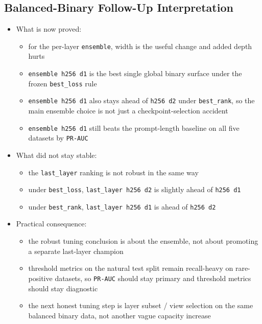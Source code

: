\documentclass[11pt]{article}
\begin{document}
\subsection*{Balanced-Binary Follow-Up Interpretation}
\begin{itemize}[leftmargin=1.5em]
\item What is now proved:
  \begin{itemize}[leftmargin=1.5em]
  \item for the per-layer \texttt{ensemble}, width is the useful change and added depth hurts
  \item \texttt{ensemble h256 d1} is the best single global binary surface under the frozen \texttt{best\_loss} rule
  \item \texttt{ensemble h256 d1} also stays ahead of \texttt{h256 d2} under \texttt{best\_rank}, so the main ensemble choice is not just a checkpoint-selection accident
  \item \texttt{ensemble h256 d1} still beats the prompt-length baseline on all five datasets by \texttt{PR-AUC}
  \end{itemize}
\item What did not stay stable:
  \begin{itemize}[leftmargin=1.5em]
  \item the \texttt{last\_layer} ranking is not robust in the same way
  \item under \texttt{best\_loss}, \texttt{last\_layer h256 d2} is slightly ahead of \texttt{h256 d1}
  \item under \texttt{best\_rank}, \texttt{last\_layer h256 d1} is ahead of \texttt{h256 d2}
  \end{itemize}
\item Practical consequence:
  \begin{itemize}[leftmargin=1.5em]
  \item the robust tuning conclusion is about the ensemble, not about promoting a separate last-layer champion
  \item threshold metrics on the natural test split remain recall-heavy on rare-positive datasets, so \texttt{PR-AUC} should stay primary and threshold metrics should stay diagnostic
  \item the next honest tuning step is layer subset / view selection on the same balanced binary data, not another vague capacity increase
  \end{itemize}
\end{itemize}
\end{document}
